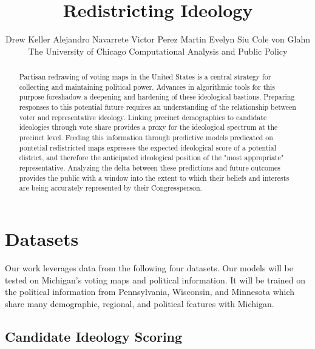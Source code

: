 \title{Redistricting Ideology}


\author{%
  Drew Keller
  \And Alejandro Navarrete
  \And Victor Perez Martin
  \And Evelyn Siu
  \And Cole von Glahn \\
  The University of Chicago
  Computational Analysis and Public Policy
}





\maketitle


\begin{abstract}
  Partisan redrawing of voting maps in the United States is a central strategy for collecting and 
  maintaining political power. Advances in algorithmic tools for this purpose foreshadow a 
  deepening and hardening of these ideological bastions. Preparing responses to this potential
  future requires an understanding of the relationship between voter and representative ideology.
  Linking precinct demographics to candidate ideologies through vote share provides a proxy for the 
  ideological spectrum at the precinct level. Feeding this information through predictive models
  predicated on pontetial redistricted maps expresses the expected ideological score of a potential
  district, and therefore the anticipated ideological position of the "most appropriate" representative.
  Analyzing the delta between these predictions and future outcomes provides the public with a window 
  into the extent to which their beliefs and interests are being accurately represented by their
  Congressperson.
\end{abstract}


\section{Datasets}


Our work leverages data from the following four datasets. Our models will be
tested on Michigan's voting maps and political information. It will be trained
on the political information from Pennsylvania, Wisconsin, and Minnesota which
share many demographic, regional, and political features with Michigan. 

\subsection{Candidate Ideology Scoring}


